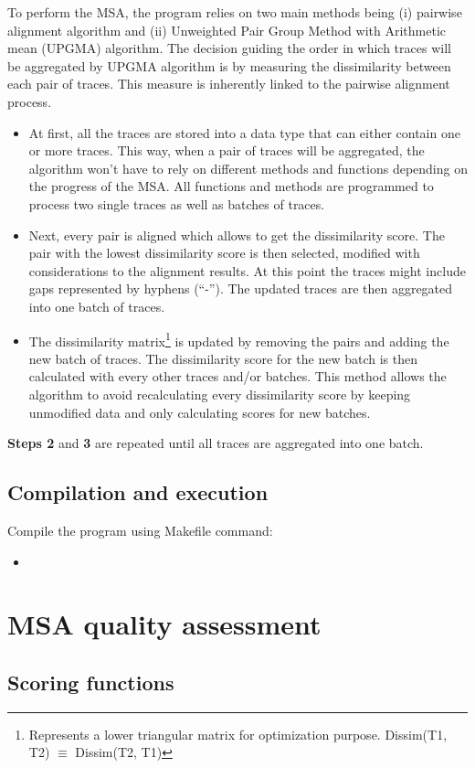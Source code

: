 \documentclass[12pt,a4paper]{article}
\begin{document}
To perform the MSA, the program relies on two main methods being (i) pairwise alignment algorithm and (ii) Unweighted Pair Group Method with Arithmetic mean (UPGMA) algorithm. The decision guiding the order in which traces will be aggregated by UPGMA algorithm is by measuring the dissimilarity between each pair of traces. This measure is inherently linked to the pairwise alignment process.

\begin{itemize}
\item[\textbf{Step 1}] At first, all the traces are stored into a data type that can either contain one or more traces. This way, when a pair of traces will be aggregated, the algorithm won't have to rely on different methods and functions depending on the progress of the MSA. All functions and methods are programmed to process two single traces as well as batches of traces.

\item[\textbf{Step 2}] Next, every pair is aligned which allows to get the dissimilarity score. The pair with the lowest dissimilarity score is then selected, modified with considerations to the alignment results. At this point the traces might include gaps represented by hyphens (``-''). The updated traces are then aggregated into one batch of traces.

\item[\textbf{Step 3}] The dissimilarity matrix\footnote{Represents a lower triangular matrix for optimization purpose. Dissim(T1, T2) $\equiv$ Dissim(T2, T1)} is updated by removing the pairs and adding the new batch of traces. The dissimilarity score for the new batch is then calculated with every other traces and/or batches. This method allows the algorithm to avoid recalculating every dissimilarity score by keeping unmodified data and only calculating scores for new batches.
\end{itemize}

\textbf{Steps 2} and \textbf{3} are repeated until all traces are aggregated into one batch.

\subsection{Compilation and execution}

Compile the program using Makefile command:
\begin{itemize}
	\item {}
\end{itemize}

\section{MSA quality assessment}

\subsection{Scoring functions}
\end{document}
